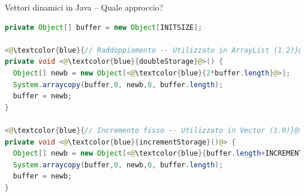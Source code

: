 \begin{frame}{Vettori dinamici in Java -- Quale approccio?}

\vspace{-9pt}
\begin{lstlisting}[language=java]
private Object[] buffer = new Object[INITSIZE];

<@\textcolor{blue}{// Raddoppiamento -- Utilizzato in ArrayList (1.2)}@>
private void <@\textcolor{blue}{doubleStorage}@>() {
  Object[] newb = new Object[<@\textcolor{blue}{2*buffer.length}@>];
  System.arraycopy(buffer,0, newb,0, buffer.length);
  buffer = newb;
}

<@\textcolor{blue}{// Incremento fisso -- Utilizzato in Vector (1.0)}@>
private void <@\textcolor{blue}{incrementStorage}()@> {
  Object[] newb = new Object[<@\textcolor{blue}{buffer.length+INCREMENT}@>];
  System.arraycopy(buffer,0, newb,0, buffer.length);
  buffer = newb;
}
\end{lstlisting}

\end{frame}


